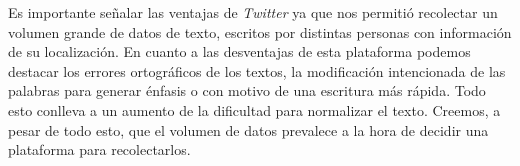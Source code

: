 Es importante señalar las ventajas de \textit{Twitter} ya que nos permitió recolectar un volumen grande de datos de texto, escritos por distintas personas con información de su localización. En cuanto a las desventajas de esta plataforma podemos destacar los errores ortográficos de los textos, la modificación intencionada de las palabras para generar énfasis o con motivo de una escritura más rápida. Todo esto conlleva a un aumento de la dificultad para normalizar el texto. Creemos, a pesar de todo esto, que el volumen de datos prevalece a la hora de decidir una plataforma para recolectarlos.


